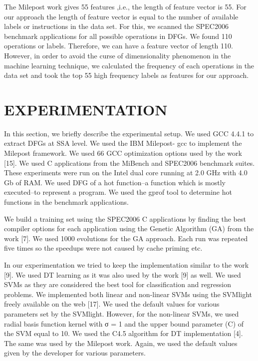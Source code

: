 \documentclass[conference]{IEEEtran}
\begin{document}
The Milepost work gives 55 features ,i.e., the length of feature vector is 55. For our approach the length of feature vector is equal to the number of available labels or instructions in the data set. For this, we scanned the SPEC2006 benchmark applications for all possible operations in DFGs. We found 110 operations or labels. Therefore, we can have a feature vector of length 110. However, in order to avoid
the curse of dimensionality phenomenon in the machine learning technique, we calculated the frequency of each operations in the data set and took the top 55 high frequency labels as features for our approach.

\section{EXPERIMENTATION}

In this section, we briefly describe the experimental setup. We used GCC 4.4.1 to extract DFGs at SSA level. We used the IBM Milepost- gcc to implement the Milepost framework. We used 66 GCC optimization options used by the work [15]. We used C applications from the MiBench and SPEC2006 benchmark suites. These experiments were run on the Intel dual core running at 2.0 GHz with 4.0 Gb of RAM. We used DFG of a hot function–a function which is mostly executed–to represent a program. We used the gprof tool to determine hot functions in the benchmark
applications.

We build a training set using the SPEC2006 C applications by finding the best compiler options for each application
using the Genetic Algorithm (GA) from the work [7]. We used 1000 evolutions for the GA approach. Each run was repeated five times so the speedups were not caused by cache priming etc.

In our experimentation we tried to keep the implementation similar to the work [9]. We used DT learning as it was also used by the work [9] as well. We used SVMs as they are considered the best tool for classification and regression problems. We implemented both linear and non-linear SVMs using the SVMlight freely available on the web [17]. We used the default values for various parameters set by the SVMlight. However, for the non-linear SVMs, we used radial basis function kernel with σ = 1 and the upper bound parameter (C) of the SVM equal to 10. We
used the C4.5 algorithm for DT implementation [4]. The same was used by the Milepost work. Again, we used the default values given by the developer for various parameters. 
\end{document}
